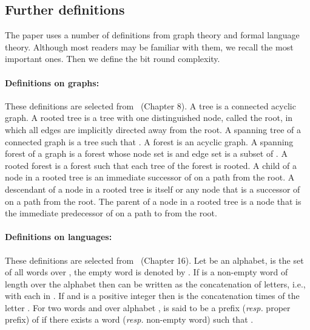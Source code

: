 \documentclass[11pt,envcountsame,letterpaper]{llncs}
\begin{document}
\subsection{Further definitions}



The paper uses a number of definitions from graph theory and formal language theory. Although most readers may be familiar with them, we recall the most important ones. Then we define the bit round complexity.

\paragraph{Definitions on graphs:}  These definitions are selected from~\cite{Rosenpress} (Chapter 8). A tree is a connected acyclic graph. A rooted tree is a tree with one
 distinguished node, called the root, in which all edges are implicitly 
directed away from the root. 
A spanning tree of a connected graph  is a tree  such that
.
A forest is an acyclic graph. A spanning forest of a graph  
is a forest whose node set is  and edge set is a subset of .
A rooted forest is a forest such that each tree of the forest is rooted.
A child of a node  in a rooted tree is an immediate
successor of  on a path from the root.
A descendant of a node  in a rooted tree is  itself or any node that
is a successor of  on a path from the root.
The parent of a node   in a rooted tree is a node that is the immediate
predecessor of  on a path to  from the root.

\paragraph{Definitions on languages:} These definitions are selected from~\cite{Rosenpress} (Chapter 16).
Let  be an alphabet,  is
 the set of all words over , the empty word is denoted by .
If  is a
non-empty
word of length  over the alphabet  then
 can be written as the concatenation of  letters, i.e.,
 with each  in .
If  and  is a positive integer then  is the 
 concatenation   times of  the letter .
For two words  and  over alphabet , 
is said to be a prefix ({\it resp.} proper prefix) of  if there exists a word ({\it resp.} non-empty word) 
such that .
\end{document}
